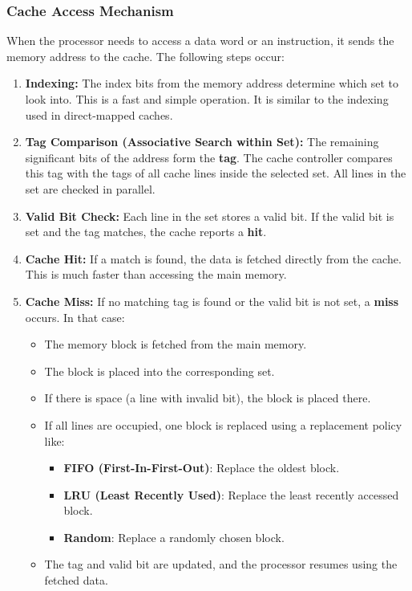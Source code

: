\documentclass[12pt]{book}
\begin{document}
\subsubsection*{Cache Access Mechanism}

When the processor needs to access a data word or an instruction, it sends the memory address to the cache. The following steps occur:

\begin{enumerate}
    \item \textbf{Indexing:}  
    The index bits from the memory address determine which set to look into. This is a fast and simple operation. It is similar to the indexing used in direct-mapped caches.

    \item \textbf{Tag Comparison (Associative Search within Set):}  
    The remaining significant bits of the address form the \textbf{tag}. The cache controller compares this tag with the tags of all cache lines inside the selected set. All lines in the set are checked in parallel.

    \item \textbf{Valid Bit Check:}  
    Each line in the set stores a valid bit. If the valid bit is set and the tag matches, the cache reports a \textbf{hit}.

    \item \textbf{Cache Hit:}  
    If a match is found, the data is fetched directly from the cache. This is much faster than accessing the main memory.

    \item \textbf{Cache Miss:}  
    If no matching tag is found or the valid bit is not set, a \textbf{miss} occurs. In that case:
    \begin{itemize}
        \item The memory block is fetched from the main memory.
        \item The block is placed into the corresponding set.
        \item If there is space (a line with invalid bit), the block is placed there.
        \item If all lines are occupied, one block is replaced using a replacement policy like:
        \begin{itemize}
            \item \textbf{FIFO (First-In-First-Out)}: Replace the oldest block.
            \item \textbf{LRU (Least Recently Used)}: Replace the least recently accessed block.
            \item \textbf{Random}: Replace a randomly chosen block.
        \end{itemize}
        \item The tag and valid bit are updated, and the processor resumes using the fetched data.
    \end{itemize}
\end{enumerate}
\end{document}
